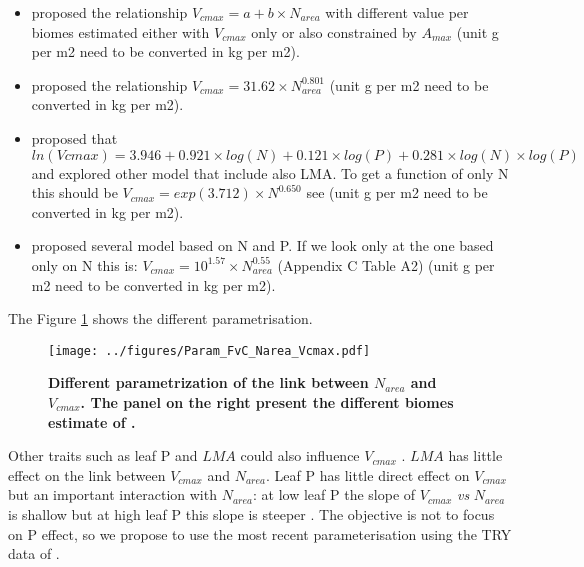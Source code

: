 \documentclass[a4paper,11pt]{article}
\begin{document}
\begin{itemize}

\item \citet{Kattge-2009} proposed the relationship $V_{cmax} = a + b
  \times N_{area}$ with different value per biomes estimated either
  with $V_{cmax}$ only or also constrained by $A_{max}$ (unit g per m2 need to be converted in kg per m2).

\item \citet{Sakschewski-2015} proposed the relationship $V_{cmax} = 31.62 \times N_{area}^{0.801}$ (unit g per m2 need to be converted in kg per m2).

\item  \citet{Walker-2014} proposed that $ln(Vcmax) = 3.946 + 0.921
  \times log(N) + 0.121 \times log(P) + 0.281 \times log(N) \times
  log(P)$ and explored other model that include also LMA. To get a
  function of only N this should be $V_{cmax} = exp(3.712) \times
  N^{0.650}$ see  \citet{Walker-2017} (unit g per m2 need to be converted in kg per m2).

\item \citet{Domingues-2010} proposed several model based on N and P.
  If we look only at the one based only on N this is: $V_{cmax} =
  10^{1.57} \times N_{area}^{0.55}$ (Appendix C Table A2) (unit g per m2 need to be converted in kg per m2).

\end{itemize}

The Figure \ref{fig:Narea_Vcmax} shows the different parametrisation.

\begin{figure}[ht]
\centering
\texttt{[image: ../figures/Param\_FvC\_Narea\_Vcmax.pdf]}
\caption{\textbf{Different parametrization of the link between $N_{area}$ and $V_{cmax}$. The panel on the right present the different biomes estimate of \citet{Kattge-2011}.}
\label{fig:Narea_Vcmax}}
\end{figure}

Other traits such as leaf P and $LMA$ could also influence $V_{cmax}$
\citep{Walker-2014,Domingues-2010}. $LMA$ has little effect on the
link between $V_{cmax}$ and $N_{area}$.  Leaf P has little direct
effect on $V_{cmax}$ but an important interaction with $N_{area}$: at
low leaf P the slope of $V_{cmax}$ \textit{vs} $N_{area}$ is shallow
but at high leaf P this slope is steeper \citep{Walker-2014}.
The objective is not to focus on P effect, so we propose to use the
most recent parameterisation using the TRY data of \citet{Sakschewski-2015}.
\end{document}
